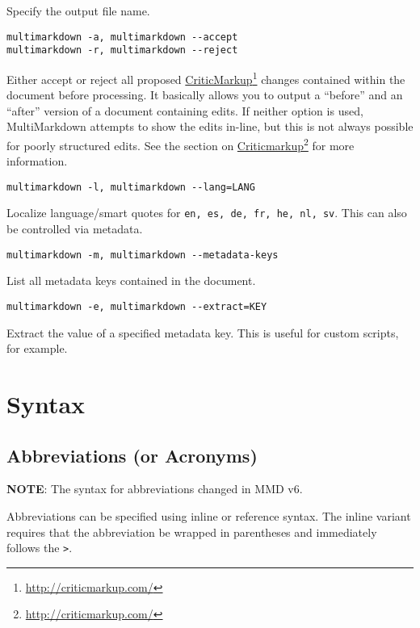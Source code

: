Specify the output file name.

\begin{verbatim}
multimarkdown -a, multimarkdown --accept
multimarkdown -r, multimarkdown --reject
\end{verbatim}

Either accept or reject all proposed \href{http://criticmarkup.com/}{CriticMarkup}\footnote{\href{http://criticmarkup.com/}{http:\slash{}\slash{}criticmarkup.com\slash{}}} changes contained within the document before processing. It basically allows you to output a ``before'' and an ``after'' version of a document containing edits. If neither option is used, MultiMarkdown attempts to show the edits in-line, but this is not always possible for poorly structured edits. See the section on \href{http://criticmarkup.com/}{Criticmarkup}\footnote{\href{http://criticmarkup.com/}{http:\slash{}\slash{}criticmarkup.com\slash{}}} for more information.

\begin{verbatim}
multimarkdown -l, multimarkdown --lang=LANG
\end{verbatim}

Localize language\slash{}smart quotes for \texttt{en, es, de, fr, he, nl, sv}. This can also be controlled via metadata.

\begin{verbatim}
multimarkdown -m, multimarkdown --metadata-keys
\end{verbatim}

List all metadata keys contained in the document.

\begin{verbatim}
multimarkdown -e, multimarkdown --extract=KEY
\end{verbatim}

Extract the value of a specified metadata key. This is useful for custom scripts, for example.

\chapter{Syntax}
\label{syntax}

\section{Abbreviations (or Acronyms)}
\label{abbreviationsoracronyms}

\textbf{NOTE}: The syntax for abbreviations changed in \gls{MMD} v6.

Abbreviations can be specified using inline or reference syntax. The inline variant requires that the abbreviation be wrapped in parentheses and immediately follows the \texttt{>}.

